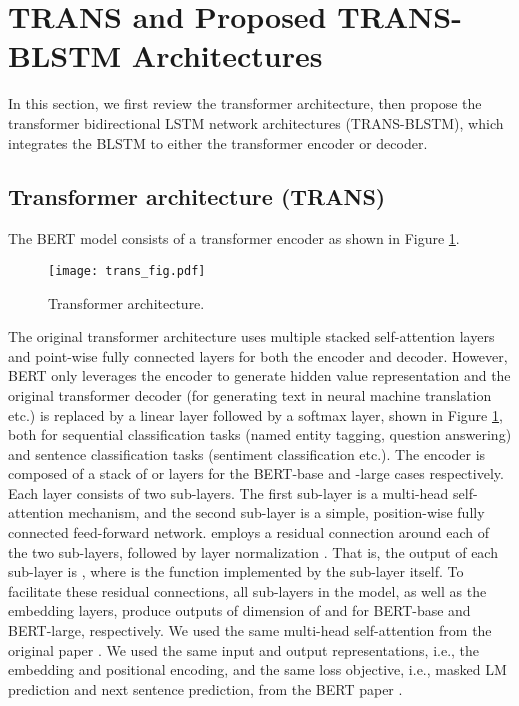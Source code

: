 \documentclass[11pt,a4paper]{article}
\begin{document}
\section{TRANS and Proposed TRANS-BLSTM Architectures}

In this section, we first review the transformer architecture, then propose the transformer bidirectional LSTM network architectures (TRANS-BLSTM), which integrates the BLSTM to either the transformer encoder or decoder. 

\subsection{Transformer architecture (TRANS)}
The BERT model consists of a transformer encoder \cite{aswani2017} as shown in Figure \ref{fig:trans}. 
\begin{figure}[!hbt]
    \centering
    \texttt{[image: trans\_fig.pdf]}
    \caption{Transformer architecture.}
    \label{fig:trans}
\end{figure}
The original transformer architecture uses multiple stacked self-attention layers and point-wise fully connected layers for both the encoder and decoder. However, BERT only leverages the encoder to generate hidden value representation and the original transformer decoder (for generating text in neural machine translation etc.) is replaced by a linear layer followed by a softmax layer, shown in Figure \ref{fig:trans}, both for sequential classification tasks (named entity tagging, question answering) and sentence classification tasks (sentiment classification etc.). The encoder is composed of a stack of  or  layers for the BERT-base and -large cases respectively. Each layer consists of two sub-layers. The first sub-layer is a multi-head self-attention mechanism, and the second sub-layer is a simple, position-wise fully connected feed-forward network. \cite{aswani2017} employs a residual connection \cite{kaiming2016} around each of the two sub-layers, followed by layer normalization \cite{jimmy2016}. That is, the output of each sub-layer is , where  is the function implemented by the sub-layer itself. To facilitate these residual connections, all sub-layers in the model, as well as the embedding layers, produce outputs of dimension of  and  for BERT-base and BERT-large, respectively. We used the same multi-head self-attention from the original paper \cite{aswani2017}. We used the same input and output representations, i.e., the embedding and positional encoding, and the same loss objective, i.e., masked LM prediction and next sentence prediction, from the BERT paper \cite{devlin2018}.
\end{document}
